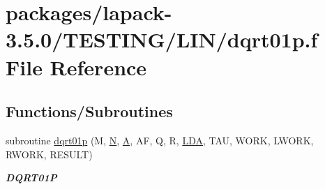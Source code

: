 \hypertarget{dqrt01p_8f}{}\section{packages/lapack-\/3.5.0/\+T\+E\+S\+T\+I\+N\+G/\+L\+I\+N/dqrt01p.f File Reference}
\label{dqrt01p_8f}
\subsection*{Functions/\+Subroutines}
\begin{DoxyCompactItemize}
\item 
subroutine \hyperlink{group__double__lin_ga59871f9dd54aa4e152ac65a950825b32}{dqrt01p} (M, \hyperlink{polmisc_8c_a0240ac851181b84ac374872dc5434ee4}{N}, \hyperlink{classA}{A}, A\+F, Q, R, \hyperlink{example__user_8c_ae946da542ce0db94dced19b2ecefd1aa}{L\+D\+A}, T\+A\+U, W\+O\+R\+K, L\+W\+O\+R\+K, R\+W\+O\+R\+K, R\+E\+S\+U\+L\+T)
\begin{DoxyCompactList}\small\item\em {\bfseries D\+Q\+R\+T01\+P} \end{DoxyCompactList}\end{DoxyCompactItemize}
